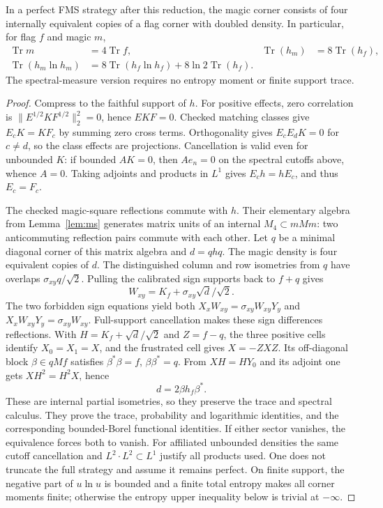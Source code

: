 \begin{lemma}\label{lem:density-sector}
In a perfect FMS strategy after this reduction, the magic corner consists of four internally equivalent copies of a flag corner with doubled density. In particular, for flag $f$ and magic $m$,
\begin{align}\label{eq:density-law}
 \operatorname{Tr}m&=4\operatorname{Tr}f,&
 \operatorname{Tr}(h_m)&=8\operatorname{Tr}(h_f),\nonumber\\
 \operatorname{Tr}(h_m\ln h_m)&=8\operatorname{Tr}(h_f\ln h_f)
                 +8\ln2\operatorname{Tr}(h_f).
\end{align}
The spectral-measure version requires no entropy moment or finite support trace.
\end{lemma}
\begin{proof}
Compress to the faithful support of $h$. For positive effects, zero correlation is $\|E^{1/2}KF^{1/2}\|_2^2=0$, hence $EKF=0$. Checked matching classes give $E_cK=KF_c$ by summing zero cross terms. Orthogonality gives $E_cE_dK=0$ for $c\ne d$, so the class effects are projections. Cancellation is valid even for unbounded $K$: if bounded $AK=0$, then $Ae_n=0$ on the spectral cutoffs above, whence $A=0$. Taking adjoints and products in $L^1$ gives $E_ch=hE_c$, and thus $E_c=F_c$.

The checked magic-square reflections commute with $h$. Their elementary algebra from Lemma~\ref{lem:ms} generates matrix units of an internal $M_4\subset mMm$: two anticommuting reflection pairs commute with each other. Let $q$ be a minimal diagonal corner of this matrix algebra and $d=qhq$. The magic density is four equivalent copies of $d$. The distinguished column and row isometries from $q$ have overlaps $\sigma_{xy}q/\sqrt2$. Pulling the calibrated sign supports back to $f+q$ gives
\[
 W_{xy}=K_f+\sigma_{xy}\sqrt d/\sqrt2.
\]
The two forbidden sign equations yield both $X_xW_{xy}=\sigma_{xy}W_{xy}Y_y$ and $X_xW_{xy}Y_y=\sigma_{xy}W_{xy}$. Full-support cancellation makes these sign differences reflections. With $H=K_f+\sqrt d/\sqrt2$ and $Z=f-q$, the three positive cells identify $X_0=X_1=X$, and the frustrated cell gives $X=-ZXZ$. Its off-diagonal block $\beta\in qMf$ satisfies $\beta^*\beta=f$, $\beta\beta^*=q$. From $XH=HY_0$ and its adjoint one gets $XH^2=H^2X$, hence
\[
 d=2\beta h_f\beta^*.
\]
These are internal partial isometries, so they preserve the trace and spectral calculus. They prove the trace, probability and logarithmic identities, and the corresponding bounded-Borel functional identities. If either sector vanishes, the equivalence forces both to vanish. For affiliated unbounded densities the same cutoff cancellation and $L^2\cdot L^2\subset L^1$ justify all products used. One does not truncate the full strategy and assume it remains perfect. On finite support, the negative part of $u\ln u$ is bounded and a finite total entropy makes all corner moments finite; otherwise the entropy upper inequality below is trivial at $-\infty$.
\end{proof}

